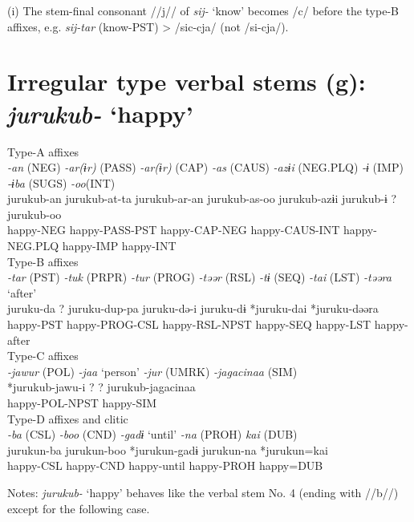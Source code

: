 (i)  The stem-final consonant //j// of \textit{sij-} ‘know’ becomes /c/ before the type-B affixes, e.g. \textit{sij-tar} (know-PST) > /sic-cja/ (not /si-cja/).

\section{Irregular type verbal stems (g): \textit{jurukub-} ‘happy’}

\ea Type-A affixes\\
\glll \textit{-an} (NEG)  \textit{-ar(ɨr)} (PASS)  \textit{-ar(ɨr)} (CAP)  \textit{-as} (CAUS)  \textit{-azɨi} (NEG.PLQ)  \textit{-ɨ} (IMP)  \textit{-ɨba} (SUGS)  \textit{-oo}(INT)\\
jurukub-an  jurukub-at-ta  jurukub-ar-an  jurukub-as-oo  jurukub-azɨi  jurukub-ɨ  ?  jurukub-oo\\
happy-NEG  happy-PASS-PST  happy-CAP-NEG  happy-CAUS-INT  happy-NEG.PLQ  happy-IMP    happy-INT\\


\ex Type-B affixes\\
\glll \textit{-tar} (PST)  \textit{-tuk} (PRPR)  \textit{-tur} (PROG)  \textit{-təər} (RSL)  \textit{-tɨ} (SEQ)  \textit{-tai} (LST)  \textit{-təəra} ‘after’\\
juruku-da  ?  juruku-dup-pa  juruku-də-i  juruku-dɨ  *juruku-dai  *juruku-dəəra\\
happy-PST    happy-PROG-CSL  happy-RSL-NPST  happy-SEQ  happy-LST  happy-after\\


\ex Type-C affixes\\
\glll \textit{-jawur} (POL)  \textit{-jaa} ‘person’  \textit{-jur} (UMRK)  \textit{-jagacinaa} (SIM)\\
*jurukub-jawu-i  ?  ?  jurukub-jagacinaa\\
happy-POL-NPST      happy-SIM\\


\ex Type-D affixes and clitic\\
\glll \textit{-ba} (CSL)  \textit{-boo} (CND)  \textit{-gadɨ} ‘until’  \textit{-na} (PROH)  \textit{kai} (DUB)\\
jurukun-ba  jurukun-boo  *jurukun-gadɨ  jurukun-na  *jurukun=kai\\
happy-CSL  happy-CND  happy-until  happy-PROH  happy=DUB\\
\z

Notes: \textit{jurukub-} ‘happy’ behaves like the verbal stem No. 4 (ending with //b//) except for the following case.

